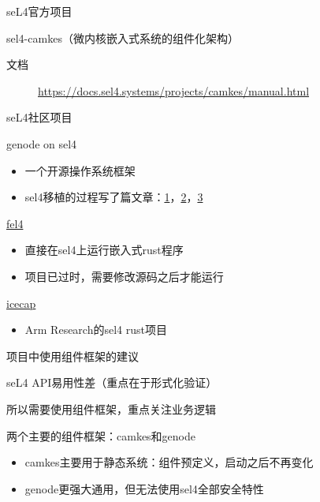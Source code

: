\documentclass[presentation,dvipdfmx,CJKbookmarks]{beamer}
\begin{document}
\begin{CJK*}{UTF8}{simsun}
\begin{frame}[label={sec:orge8446d0}]{seL4\thinspace 官方项目}
\begin{block}{sel4-camkes（微内核嵌入式系统的组件化架构）}
\begin{description}
\item[{文档}] \url{https://docs.sel4.systems/projects/camkes/manual.html}
\end{description}
\end{block}
\end{frame}

\begin{frame}[label={sec:org71947c0}]{seL4\thinspace 社区项目}
\begin{block}{genode on sel4}
\begin{itemize}
\item 一个开源操作系统框架
\item sel4\thinspace 移植的过程写了\thinspace 篇文章：\href{https://genode.org/documentation/articles/sel4\_part\_1}{1}，\href{https://genode.org/documentation/articles/sel4\_part\_2}{2}，\href{https://genode.org/documentation/articles/sel4\_part\_3}{3}
\end{itemize}
\end{block}
\begin{block}{\href{https://github.com/PolySync/cargo-fel4}{fel4}}
\begin{itemize}
\item 直接在\thinspace sel4\thinspace 上运行嵌入式\thinspace rust\thinspace 程序
\item 项目已过时，需要修改源码之后才能运行
\end{itemize}
\end{block}
\begin{block}{\href{https://gitlab.com/arm-research/security/icecap/icecap/}{icecap}}
\begin{itemize}
\item Arm Research\thinspace 的\thinspace sel4 rust\thinspace 项目
\end{itemize}
\end{block}
\end{frame}

\begin{frame}[label={sec:org40f3233}]{项目中使用组件框架的建议}
\begin{block}{seL4 API\thinspace 易用性差（重点在于形式化验证）}
\end{block}
\begin{block}{所以需要使用组件框架，重点关注业务逻辑}
\end{block}
\begin{block}{两个主要的组件框架：camkes\thinspace 和\thinspace genode}
\begin{itemize}
\item camkes\thinspace 主要用于静态系统：组件预定义，启动之后不再变化
\item genode\thinspace 更强大通用，但无法使用\thinspace sel4\thinspace 全部安全特性
\end{itemize}
\end{block}
\end{frame}


\end{CJK*}
\end{document}
